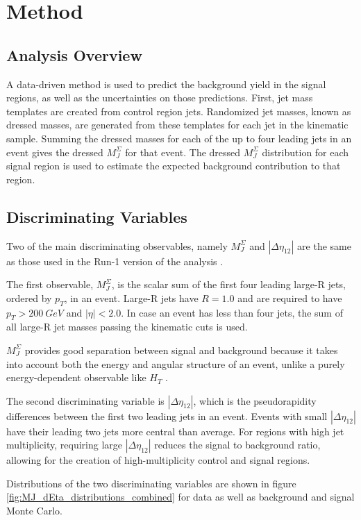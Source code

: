 \chapter{Method}

\section{Analysis Overview}
A data-driven method is used to predict the background yield in the
signal regions, as well as the uncertainties on those
predictions. First, jet mass templates are created from control region jets.
Randomized jet masses, known as dressed masses, are generated from
these templates for each jet in the kinematic sample. Summing the
dressed masses for each of the up to four leading jets in an event gives the
dressed $M_{J}^{\Sigma}$ for that event. The dressed $M_{J}^{\Sigma}$
distribution for each signal region is
used to estimate the expected background contribution to that region.

\section{Discriminating Variables}
Two of the main discriminating observables, namely $M_J^{\Sigma}$ and
$|\Delta\eta_{12}|$ are the same as those used in the Run-1 version of
the analysis \cite{run1-multijet}. 

The first observable,
$M_J^{\Sigma}$, is the scalar sum of the first four leading large-R jets,
ordered by $p_{T}$, in an event. Large-R jets have $R=1.0$ and are
required to have $p_{T} > 200~GeV$ and $|\eta|<2.0$. In case an event has less than four
jets, the sum of all large-R jet masses passing the kinematic cuts is
used.

$M_{J}^{\Sigma}$ provides good separation between signal and
background because it takes into
account both the energy and angular structure of an event, unlike a
purely energy-dependent observable like $H_{T}$ \cite{hook_mj,
  elhedri_mj}.

The second discriminating variable is $|\Delta \eta_{12}|$, which is
the pseudorapidity differences between the first two leading jets in
an event. Events with small $|\Delta \eta_{12}|$ have their leading
two jets more central than average. For regions with high jet
multiplicity, requiring large $|\Delta \eta_{12}|$ reduces the signal
to background ratio, allowing for the creation of high-multiplicity
control and signal regions.

Distributions of the two discriminating variables are shown in figure
\ref{fig:MJ_dEta_distributions_combined} for data as well as
background and signal Monte Carlo.

